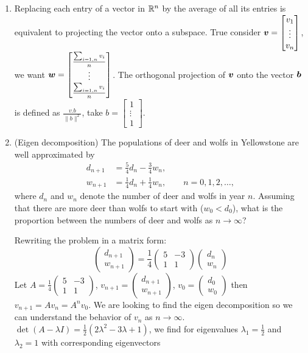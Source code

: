 \documentclass[10pt]{article}
\begin{document}
\begin{enumerate}
	\item Replacing each entry of a vector in $\mathbb{R}^n$ by the average of all its entries is equivalent to projecting the vector onto a subspace. 
	True consider $\bm{v} = \begin{bmatrix} v_1\\ \vdots\\ v_n\end{bmatrix}$, we want $\bm{w} = \begin{bmatrix} \frac{\sum_{i=1,n} v_i}{n}\\ \vdots\\ \frac{\sum_{i=1,n} v_i}{n}\end{bmatrix}$. The orthogonal projection
	of $\bm{v}$ onto the vector $\bm{b}$ is defined as $\frac{v . b} {\| b \|^2}$, take  $b= \begin{bmatrix} 1\\  \vdots\\1 \end{bmatrix}$.
\ee

\item (Eigen decomposition) The populations of deer and wolfs in Yellowstone are well approximated by   
\begin{align}
d_{n+1} & = \frac{5}{4}d_n - \frac{3}{4}w_n , \\
w_{n+1} & = \frac{1}{4}d_n + \frac{1}{4}w_n, \qquad n=0,1,2,\ldots,
\end{align}
where $d_n$ and $w_n$ denote the number of deer and wolfs in year $n$. Assuming that there are more deer than wolfs to start with ($w_0 < d_0$), what is the proportion between the numbers of deer and wolfs as $n\rightarrow \infty$? 


Rewriting the problem in a matrix form: 
$$
\begin{pmatrix}
	d_{n+1} \\
	w_{n+1}
\end{pmatrix}
= \frac{1}{4}
\begin{pmatrix}
	5 & -3 \\
	1 & 	1
\end{pmatrix}
\begin{pmatrix}
	d_n \\
	w_n
\end{pmatrix}
$$
Let  $A = \frac{1}{4}
\begin{pmatrix}
	5 & -3 \\
	1 & 	1
\end{pmatrix}$, $v_{n+1} = \begin{pmatrix}
	d_{n+1} \\
	w_{n+1}
\end{pmatrix}$, $v_0 =  \begin{pmatrix} d_0 \\ w_0 \end{pmatrix}$ then $v_{n+1}= A v_n = A^n v_0$. We are looking to find the eigen decomposition so we can understand the behavior of $v_n$ as $n \rightarrow \infty$.
$\det(A - \lambda I) =  \frac{1}{2}  (2 \lambda^2 -3 \lambda + 1)$, we find for eigenvalues $\lambda_1=\frac{1}{2}$ and $\lambda_2=1$ with corresponding eigenvectors 


\end{enumerate}
\end{document}
